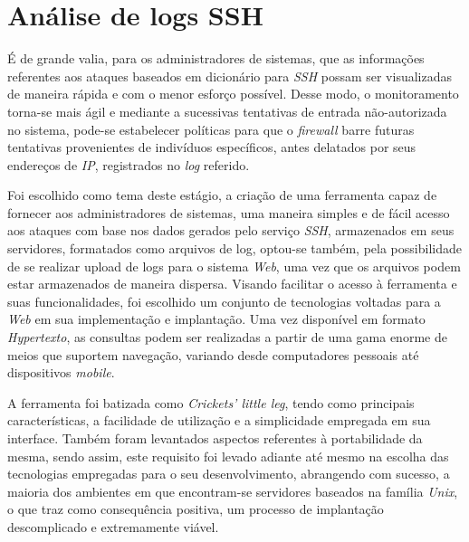 \section{Análise de logs SSH}

É de grande valia, para os administradores de sistemas, que as informações referentes aos ataques baseados em dicionário para \textit{SSH} possam ser visualizadas de maneira rápida e com o menor esforço possível. Desse modo, o monitoramento torna-se mais ágil e mediante a sucessivas tentativas de entrada não-autorizada no sistema, pode-se estabelecer políticas para que o \textit{firewall} barre futuras tentativas provenientes de indivíduos específicos, antes delatados por seus endereços de \textit{IP}, registrados no \textit{log} referido.

Foi escolhido como tema deste estágio, a criação de uma ferramenta capaz de fornecer aos administradores de sistemas, uma maneira simples e de fácil acesso aos ataques com base nos dados gerados pelo serviço \textit{SSH}, armazenados em seus servidores, formatados como arquivos de log, optou-se também, pela possibilidade de se realizar upload de logs para o sistema \textit{Web}, uma vez que os arquivos podem estar armazenados de maneira dispersa. Visando facilitar o acesso à ferramenta e suas funcionalidades, foi escolhido um conjunto de tecnologias voltadas para a \textit{Web} em sua implementação e implantação. Uma vez disponível em formato \textit{Hypertexto}, as consultas  podem ser realizadas a partir de uma gama enorme de meios que suportem navegação, variando desde computadores pessoais até dispositivos \textit{mobile}.

A ferramenta foi batizada como \textit{Crickets' little leg}, tendo como principais características, a facilidade de utilização e a simplicidade empregada em sua interface. Também foram levantados aspectos referentes à portabilidade da mesma, sendo assim, este requisito foi levado adiante até mesmo na escolha das tecnologias empregadas para o seu desenvolvimento, abrangendo com sucesso, a maioria dos ambientes em que encontram-se servidores baseados na família \textit{Unix}, o que traz como consequência positiva, um processo de implantação descomplicado e extremamente viável.